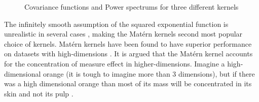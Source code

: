 \begin{figure}[!ht]
  \centering
    \quad
{}\quad
\caption{Covariance functions and Power spectrums for three different kernels}
       \label{figKernelAndPowerSpectrums}
\end{figure}

The infinitely smooth assumption of the squared exponential function is unrealistic in several cases \cite{stein2012interpolation}, making the Mat\'ern kernels second most popular choice of kernels. Mat\'ern kernels have been found to have superior performance on datasets with high-dimensions \cite{le2013fastfood}. It is argued that the Mat\'ern kernel accounts for the concentration of measure effect in higher-dimensions. Imagine a high-dimensional orange (it is tough to imagine more than 3 dimensions), but if there was a high dimensional orange than most of its mass will be concentrated in its skin and not its pulp \cite{domingos2012few}. 

